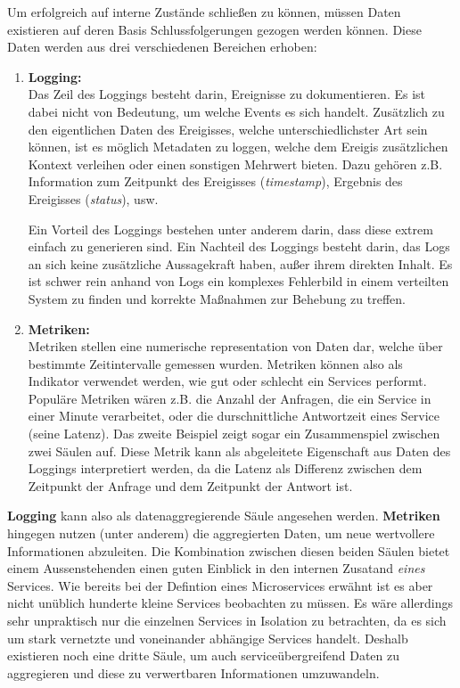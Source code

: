 \begin{definition}\autocites[Chapter 4: Three Pillars of Observability]{Sridharan2018}[S. 373f]{microservice_enterprise}
	Um erfolgreich auf interne Zustände schließen zu können, müssen Daten existieren auf deren Basis Schlussfolgerungen gezogen werden können. Diese Daten werden aus drei verschiedenen Bereichen erhoben:


	\begin{enumerate}
		\item \textbf{Logging:}\\
		Das Zeil des Loggings besteht darin, Ereignisse zu dokumentieren. Es ist dabei nicht von Bedeutung, um welche Events es sich handelt. Zusätzlich zu den eigentlichen Daten des Ereigisses, welche unterschiedlichster Art sein können, ist es möglich Metadaten zu loggen, welche dem Ereigis zusätzlichen Kontext verleihen oder einen sonstigen Mehrwert bieten. Dazu gehören z.B. Information zum Zeitpunkt des Ereigisses (\textit{timestamp}), Ergebnis des Ereigisses (\textit{status}), usw. 
		
		Ein Vorteil des Loggings bestehen unter anderem darin, dass diese extrem einfach zu generieren sind. Ein Nachteil des Loggings besteht darin, das Logs an sich keine zusätzliche Aussagekraft haben, außer ihrem direkten Inhalt. Es ist schwer rein anhand von Logs ein komplexes Fehlerbild in einem verteilten System zu finden und korrekte Maßnahmen zur Behebung zu treffen.
		\item \textbf{Metriken:}\\
		Metriken stellen eine numerische representation von Daten dar, welche über bestimmte Zeitintervalle gemessen wurden. Metriken können also als Indikator verwendet werden, wie gut oder schlecht ein Services performt. Populäre Metriken wären z.B. die Anzahl der Anfragen, die ein Service in einer Minute verarbeitet, oder die durschnittliche Antwortzeit eines Service (seine Latenz). Das zweite Beispiel zeigt sogar ein Zusammenspiel zwischen zwei Säulen auf. Diese Metrik kann als abgeleitete Eigenschaft aus Daten des Loggings interpretiert werden, da die Latenz als Differenz zwischen dem Zeitpunkt der Anfrage und dem Zeitpunkt der Antwort ist.
		\setcounter{pillarsCounter}{\value{enumi}}
	\end{enumerate}

	\textbf{Logging} kann also als datenaggregierende Säule angesehen werden. \textbf{Metriken} hingegen nutzen (unter anderem) die aggregierten Daten, um neue wertvollere Informationen abzuleiten. Die Kombination zwischen diesen beiden Säulen bietet einem Aussenstehenden einen guten Einblick in den internen Zusatand \textit{eines} Services. Wie bereits bei der Defintion eines Microservices erwähnt ist es aber nicht unüblich hunderte kleine Services beobachten zu müssen. Es wäre allerdings sehr unpraktisch nur die einzelnen Services in Isolation zu betrachten, da es sich um stark vernetzte und voneinander abhängige Services handelt. Deshalb existieren noch eine dritte Säule, um auch serviceübergreifend Daten zu aggregieren und diese zu verwertbaren Informationen umzuwandeln.


\end{definition}
